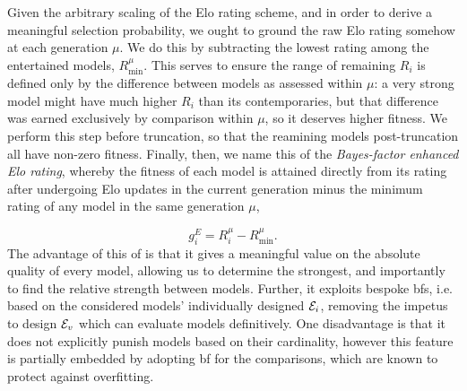 Given the arbitrary scaling of the Elo rating scheme, 
    and in order to derive a meaningful selection probability, 
    we ought to ground the raw Elo rating somehow at each generation $\mu$. 
We do this by subtracting the lowest rating among the entertained models, $R_{\textrm{min}}^{\mu}$.
This serves to ensure the range of remaining $R_i$ is defined only by the difference between
    models as assessed within $\mu$: 
    a very strong model might have much higher $R_i$ than its contemporaries, 
    but that difference was earned exclusively by comparison within $\mu$, 
    so it deserves higher fitness. 
We perform this step before truncation, so that the reamining models post-truncation
    all have non-zero fitness. 
Finally, then, we name this \gls{of} the \emph{Bayes-factor enhanced Elo rating}, 
    whereby the fitness of each model is attained directly from its rating
    after undergoing Elo updates in the current generation minus the minimum rating of any model 
    in the same generation $\mu$,

\begin{equation}
    \label{eqn:elo_fitness}
    g_i^E = R_i^{\mu} - R_{\textrm{min}}^{\mu}.
\end{equation}
The advantage of this \gls{of} is that it gives a meaningful value on the absolute quality of every model, 
    allowing us to determine the strongest, and importantly to find the relative strength between models. 
Further, it exploits bespoke \glspl{bf}, i.e. based on the considered models' 
    individually designed ${ \mathcal{E} }_i$,
    removing the impetus to design ${ \mathcal{E} }_v$ which can
    evaluate models definitively. 
One disadvantage is that it does not explicitly punish models based 
    on their cardinality, 
    however this feature is partially embedded by adopting \gls{bf} for the comparisons, 
    which are known to protect against overfitting.

